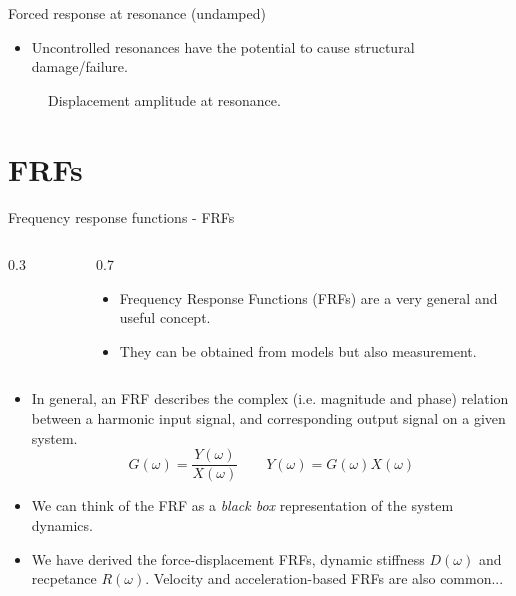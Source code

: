 \documentclass[11pt,aspectratio=169,handout]{beamer}
\begin{document}
\begin{frame}[c]{Forced response at resonance (undamped)}
	\begin{itemize}
		\item<1-> Uncontrolled resonances have the potential to cause structural damage/failure. 
	\end{itemize}
	\begin{figure}
	
	\caption{Displacement amplitude at resonance.}
	\end{figure}
\end{frame}

\section{FRFs}
\begin{frame}[c]{Frequency response functions - FRFs}
	\begin{columns}[T]
		\begin{column}{0.3\textwidth}
			\begin{figure}[]
				\vspace{-0.2cm}
				
			\end{figure}
		\end{column}
		\begin{column}{0.7\textwidth}			
			\begin{itemize}
			\item<1-> Frequency Response Functions (FRFs) are a very general and useful concept.
			\item<2-> They can be obtained from models but also measurement. 
			\end{itemize}
		\end{column}
	\end{columns}
	\begin{itemize}
		\item<3-> In general, an FRF describes the complex (i.e. magnitude and phase) relation between a harmonic input signal, and corresponding output signal on a given system.
		\begin{equation}
			G(\omega) = \frac{Y(\omega)}{X(\omega)}	\quad \quad Y(\omega) = G(\omega)X(\omega)
		\end{equation}
		\item<4-> We can think of the FRF as a \textit{black box} representation of the system dynamics.
		\item<5-> We have derived the force-displacement FRFs, dynamic stiffness $D(\omega)$ and recpetance $R(\omega)$. Velocity and acceleration-based FRFs are also common...
\end{itemize}
\end{frame}
\end{document}
